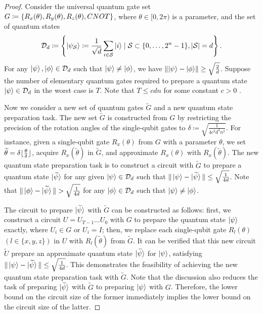 \documentclass[a4paper,UKenglish,cleveref, autoref, thm-restate]{lipics-v2021}
\DeclarePairedDelimiter\cbra{\{}{\}}
\DeclarePairedDelimiter\abs{\lvert}{\rvert}
\DeclarePairedDelimiter\Abs{\lVert}{\rVert}
\DeclarePairedDelimiter\floor{\lfloor}{\rfloor}
\begin{document}
\begin{proof}
Consider the universal quantum gate set $G \coloneqq \cbra{R_x(\theta), R_y(\theta), R_z(\theta), CNOT}$, where $\theta \in [0, 2\pi)$ is a parameter, and the set of quantum states
\begin{align}
    \mathcal{D}_d \coloneqq \left\{ \ket{\psi_\mathcal{S}} \coloneqq \frac{1}{\sqrt{d}} \sum_{i \in \mathcal{S}} \ket{i} \mid \mathcal{S} \subset \{0, \dots, 2^n-1\}, \abs{\mathcal{S}} = d \right\}.
\end{align}
For any $\ket{\psi}, \ket{\phi} \in \mathcal{D}_d$ such that $\ket{\psi} \neq \ket{\phi}$, we have $\Abs{\ket{\psi} - \ket{\phi}} \geq \sqrt{\frac{2}{d}}$. Suppose the number of elementary quantum gates required to prepare a quantum state $\ket{\psi} \in \mathcal{D}_d$ in the worst case is $T$. Note that  $ T \leq cdn $ for some constant $ c > 0 $ \cite{gleinig2021efficient, malvetti2021quantum}.

Now we consider a new set of quantum gates $\widetilde{G}$ and a new quantum state preparation task. The new set $\widetilde{G}$ is constructed from $G$ by restricting the precision of the rotation angles of the single-qubit gates to $\delta \coloneqq \sqrt{\frac{1}{4c^2d^3n^2}}$. For instance, given a single-qubit gate $R_x(\theta)$ from $G$ with a parameter $\theta$,  we  set $\widetilde{\theta} = \delta \floor{\frac{\theta}{\delta}}$, acquire $R_x(\widetilde{\theta})$ in $\widetilde{G}$, and approximate $R_x(\theta)$ with $R_x(\widetilde{\theta})$. The new quantum state preparation task is to construct a circuit with $\widetilde{G}$ to prepare a quantum state $\ket{\widetilde{\psi}}$ for any given $\ket{\psi} \in \mathcal{D}_d$ such that $\|\ket{\psi} - \ket{\widetilde{\psi}}\| \leq \sqrt{\frac{1}{4d}}$. Note that $\|\ket{\phi} - \ket{\widetilde{\psi}}\| > \sqrt{\frac{1}{4d}}$ for any $\ket{\phi} \in \mathcal{D}_d$ such that $\ket{\psi} \neq \ket{\phi}$.

The circuit to prepare $\ket{\widetilde{\psi}}$ with $\widetilde{G}$ can be constructed as follows: first, we construct a circuit $U = U_{T-1} \dots U_0$ with $G$ to prepare the quantum state $\ket{\psi}$ exactly, where $U_i \in G$ or $U_i = I$; then, we replace each single-qubit gate $R_l(\theta)$ $(l\in\{x,y,z\})$ in $U$ with $R_l(\widetilde{\theta})$ from $\widetilde{G}$. It can be verified that this new circuit $\widetilde{U}$ prepare an approximate quantum state $\ket{\widetilde{\psi}}$ for $\ket{\psi}$, satisfying $\|\ket{\psi} - \ket{\widetilde{\psi}}\| \leq \sqrt{\frac{1}{4d}}$. This demonstrates the feasibility of achieving the new quantum state preparation task with $\widetilde{G}$. Note that the discussion also reduces the task of preparing $\ket{\widetilde{\psi}}$ with $\widetilde{G}$ to preparing $\ket{\psi}$ with $G$. Therefore, the lower bound on the circuit size of the former immediately implies the lower bound on the circuit size of the latter.


\end{proof}
\end{document}
